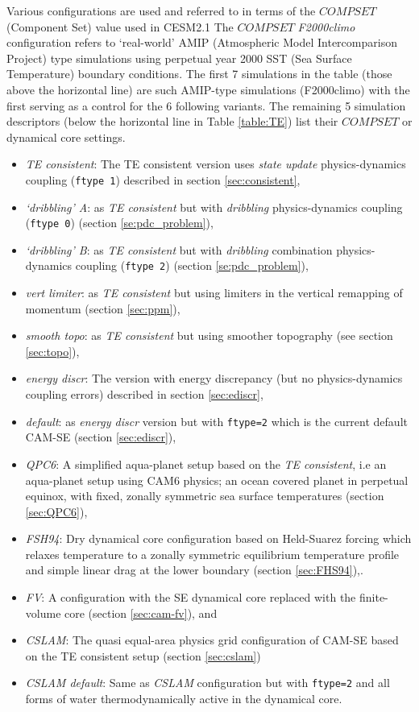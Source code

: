 \documentclass[draft,linenumbers]{agujournal}
\begin{document}
Various configurations are used and referred to in terms of the $COMPSET$ (Component Set) value used in CESM2.1 The $COMPSET$ {\em{F2000climo}} configuration refers to `real-world' AMIP (Atmospheric Model Intercomparison Project) type simulations using perpetual year 2000 SST (Sea Surface Temperature) boundary conditions. The first 7 simulations in the table (those above the horizontal line) are such AMIP-type simulations (F2000climo) with the first serving as a control for the 6 following variants. The remaining 5 simulation descriptors (below the horizontal line in Table \ref{table:TE}) list their $COMPSET$ or dynamical core settings.

\begin{itemize}
\item {\em{TE consistent}}: The TE consistent version uses {\em{state update}} physics-dynamics coupling ({\tt{ftype 1}}) described in section \ref{sec:consistent},
\item {\em{`dribbling' A}}: as {\em{TE consistent}} but with {\em{dribbling}} physics-dynamics coupling ({\tt{ftype 0}}) (section \ref{se:pdc_problem}),
\item {\em{`dribbling' B}}: as {\em{TE consistent}} but with  {\em{dribbling}} combination physics-dynamics coupling ({\tt{ftype 2}}) (section \ref{se:pdc_problem}),
\item {\em{vert limiter}}: as {\em{TE consistent}} but using limiters in the vertical remapping of momentum (section \ref{sec:ppm}),
\item {\em{smooth topo}}: as {\em{TE consistent}} but  using smoother topography (see section \ref{sec:topo}),
\item {\em{energy discr}}: The version with energy discrepancy (but no physics-dynamics coupling errors) described in section \ref{sec:ediscr},
\item {\em{default}}: as {\em{energy discr}} version but with {\tt{ftype=2}} which is the current default CAM-SE (section \ref{sec:ediscr}),
\item {\em{QPC6}}: A simplified aqua-planet setup based on the {\em{TE consistent}}, i.e an aqua-planet setup using CAM6 physics; an ocean covered planet in perpetual equinox, with fixed, zonally symmetric sea surface temperatures \citep{NH2000ASL,MWO2016JAMES} (section \ref{sec:QPC6}), 
\item {\em{FSH94}}: Dry dynamical core configuration based on Held-Suarez forcing which relaxes temperature to a zonally symmetric equilibrium temperature profile and simple linear drag at the lower boundary \citep{HS1994BAMS} (section \ref{sec:FHS94}),. 
\item {\em{FV}}: A configuration with the SE dynamical core replaced with the finite-volume core (section \ref{sec:cam-fv}), and
\item {\em{CSLAM}}: The quasi equal-area physics grid configuration of CAM-SE based on the TE consistent setup (section \ref{sec:cslam})
\item {\em{CSLAM default}}: Same as {\em{CSLAM}} configuration but with {\tt{ftype=2}} and all forms of water thermodynamically{\color{red}{/inertially}} active in the dynamical core.
\end{itemize}
\end{document}
